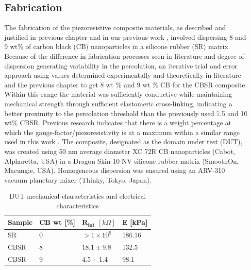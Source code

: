 \subsection{Fabrication} \label{subsec:EIT dev Fabrication}
The fabrication of the piezoresistive composite materials, as described and justified in previous chapter and in our previous work \citep{Ellingham2021}, involved dispersing 8 and 9 wt\% of carbon black (CB) nanoparticles in a silicone rubber (SR) matrix. Because of the difference in fabrication processes seen in literature \cite{D'Asaro2017, Shang2016} and degree of dispersion generating variability in the percolation, an iterative trial and error approach using values determined experimentally and theoretically in literature and the previous chapter to get 8 wt \% and 9 wt \% CB for the CBSR composite. Within this range the material was sufficiently conductive while maintaining mechanical strength through sufficient elastomeric cross-linking, indicating a better proximity to the percolation threshold than the previously used 7.5 and 10 wt\% CBSR. Previous research indicates that there is a weight percentage at which the gauge-factor/piezoresistivity is at a maximum within a similar range used in this work \cite{Dong2017, Yang2020}. The composite, designated as the domain under test (DUT), was created using 50 nm average diameter XC 72R CB nanoparticles (Cabot, Alpharetta, USA) in a Dragon Skin 10 NV silicone rubber matrix (SmoothOn, Macungie, USA). Homogeneous dispersion was ensured using an ARV-310 vacuum planetary mixer (Thinky, Tokyo, Japan).
\begin{table}[H]
\caption{DUT mechanical characteristics and electrical characteristics}
\label{tab:DUT_char}
\begin{center}
\begin{tabular}{llll}
\hline
\textbf{Sample}            & \textbf{CB wt} {[}\%{]}    & $\mathbf{R_{int}}$ $[k\Omega]$ & \textbf{E} {[}kPa{]}\\ \hline%
SR        & 0        &         $>1\times10^9$        &       186.16\\
CBSR        & 8        &         $18.1\pm9.8$          &       132.5\\
CBSR        & 9        &         $4.5\pm1.4$           &       98.1\\
\hline
\end{tabular}
\end{center}
\end{table}
